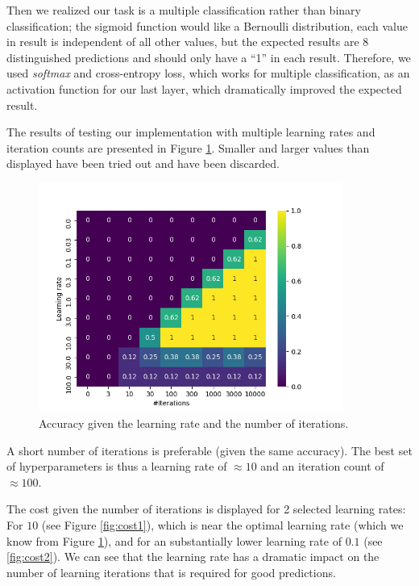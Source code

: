 \documentclass[conference]{IEEEtran}
\begin{document}
Then we realized our task is a multiple classification rather than binary classification; the sigmoid function would like a Bernoulli distribution, each value in result is independent of all other values, but the expected results are 8 distinguished predictions and should only have a “1” in each result. Therefore, we used \textit{softmax} and cross-entropy loss, which works for multiple classification, as an activation function for our last layer, which dramatically improved the expected result.

The results of testing our implementation with multiple learning rates and iteration counts are presented in Figure \ref{fig:performance}. Smaller and larger values than displayed have been tried out and have been discarded.

\begin{figure}
    \centering
    \includegraphics[width=10cm]{learning_performance.png}
    \caption{Accuracy given the learning rate and the number of iterations.}
    \label{fig:performance}
\end{figure}

A short number of iterations is preferable (given the same accuracy). The best set of hyperparameters is thus a learning rate of $\approx10$ and an iteration count of $\approx100$.

The cost given the number of iterations is displayed for 2 selected learning rates: For $10$ (see Figure \ref{fig:cost1}), which is near the optimal learning rate (which we know from Figure \ref{fig:performance}), and for an substantially lower learning rate of $0.1$ (see \ref{fig:cost2}). We can see that the learning rate has a dramatic impact on the number of learning iterations that is required for good predictions.
\end{document}
